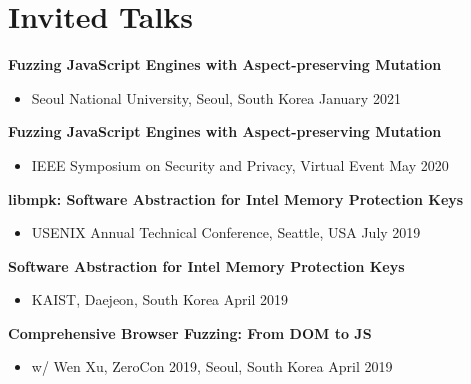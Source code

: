 \section*{Invited Talks}
\begin{description}

    \item \textbf{Fuzzing JavaScript Engines with Aspect-preserving Mutation}
      \begin{itemize}
          \item Seoul National University, Seoul, South Korea \dotfill January 2021
      \end{itemize}

    \item \textbf{Fuzzing JavaScript Engines with Aspect-preserving Mutation}
      \begin{itemize}
          \item IEEE Symposium on Security and Privacy, Virtual Event \dotfill May 2020
      \end{itemize}

    \item \textbf{libmpk: Software Abstraction for Intel Memory Protection Keys}
      \begin{itemize}
          \item USENIX Annual Technical Conference, Seattle, USA \dotfill July 2019
      \end{itemize}

    \item \textbf{Software Abstraction for Intel Memory Protection Keys}
      \begin{itemize}
         \item KAIST, Daejeon, South Korea \dotfill April 2019
      \end{itemize}

    \item \textbf{Comprehensive Browser Fuzzing: From DOM to JS}
      \begin{itemize}
          \item w/ Wen Xu, ZeroCon 2019, Seoul, South Korea \dotfill April 2019
      \end{itemize}
      
\end{description}
